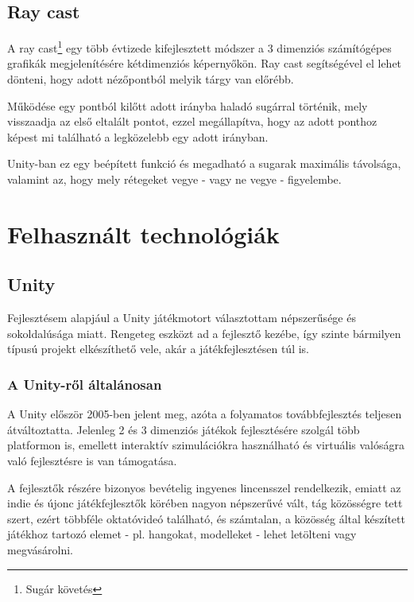 \documentclass[
]{thesis-ekf}
\theoremstyle{definition}
\theoremstyle{remark}
\begin{document}
\section{Ray cast}

A ray cast\cite{raycast}\footnote{Sugár követés} egy több évtizede kifejlesztett módszer a 3 dimenziós számítógépes grafikák megjelenítésére kétdimenziós képernyőkön. Ray cast segítségével el lehet dönteni, hogy adott nézőpontból melyik tárgy van előrébb.

Működése egy pontból kilőtt adott irányba haladó sugárral történik, mely visszaadja az első eltalált pontot, ezzel megállapítva, hogy az adott ponthoz képest mi található a legközelebb egy adott irányban.

Unity-ban ez egy beépített funkció és megadható a sugarak maximális távolsága, valamint az, hogy mely rétegeket vegye - vagy ne vegye - figyelembe.


\chapter{Felhasznált technológiák}

\section{Unity}

Fejlesztésem alapjául a Unity\cite{unity} játékmotort választottam népszerűsége és sokoldalúsága miatt. Rengeteg eszközt ad a fejlesztő kezébe, így szinte bármilyen típusú projekt elkészíthető vele, akár a játékfejlesztésen túl is.

\subsection{A Unity-ről általánosan}

A Unity először 2005-ben jelent meg, azóta a folyamatos továbbfejlesztés teljesen átváltoztatta. Jelenleg 2 és 3 dimenziós játékok fejlesztésére szolgál több platformon is, emellett interaktív szimulációkra használható és virtuális valóságra való fejlesztésre is van támogatása.

A fejlesztők részére bizonyos bevételig ingyenes lincensszel rendelkezik, emiatt az indie és újonc játékfejlesztők körében nagyon népszerűvé vált, tág közösségre tett szert, ezért többféle oktatóvideó található, és számtalan, a közösség által készített játékhoz tartozó elemet - pl. hangokat, modelleket - lehet letölteni vagy megvásárolni.
\end{document}

